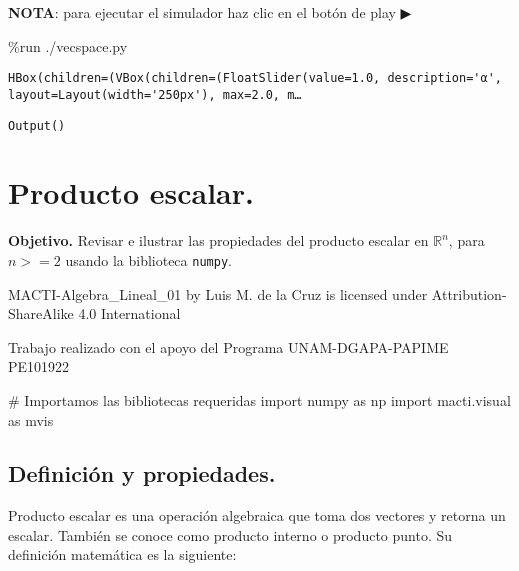 \documentclass[
  letterpaper,
  DIV=11,
  numbers=noendperiod]{scrreprt}
\newenvironment{Shaded}{\begin{snugshade}}{\end{snugshade}}
\newcommand{\CommentTok}[1]{\textcolor[rgb]{0.37,0.37,0.37}{#1}}
\newcommand{\ImportTok}[1]{\textcolor[rgb]{0.00,0.46,0.62}{#1}}
\newcommand{\NormalTok}[1]{\textcolor[rgb]{0.00,0.23,0.31}{#1}}
\newcommand{\OperatorTok}[1]{\textcolor[rgb]{0.37,0.37,0.37}{#1}}
\begin{document}
\textbf{NOTA}: para ejecutar el simulador haz clic en el botón de play ▶

\begin{Shaded}
\begin{Highlighting}[]
\OperatorTok{\%}\NormalTok{run .}\OperatorTok{/}\NormalTok{vecspace.py}
\end{Highlighting}
\end{Shaded}

\begin{verbatim}
HBox(children=(VBox(children=(FloatSlider(value=1.0, description='α', layout=Layout(width='250px'), max=2.0, m…
\end{verbatim}

\begin{verbatim}
Output()
\end{verbatim}


\chapter{Producto escalar.}\label{producto-escalar.}

\textbf{Objetivo.} Revisar e ilustrar las propiedades del producto
escalar en \(\mathbb{R}^n\), para \(n>=2\) usando la biblioteca
\texttt{numpy}.

MACTI-Algebra\_Lineal\_01 by Luis M. de la Cruz is licensed under
Attribution-ShareAlike 4.0 International

Trabajo realizado con el apoyo del Programa UNAM-DGAPA-PAPIME PE101922

\begin{Shaded}
\begin{Highlighting}[]
\CommentTok{\# Importamos las bibliotecas requeridas}
\ImportTok{import}\NormalTok{ numpy }\ImportTok{as}\NormalTok{ np}
\ImportTok{import}\NormalTok{ macti.visual }\ImportTok{as}\NormalTok{ mvis}
\end{Highlighting}
\end{Shaded}

\section{Definición y propiedades.}\label{definiciuxf3n-y-propiedades.}

Producto escalar es una operación algebraica que toma dos vectores y
retorna un escalar. También se conoce como producto interno o producto
punto. Su definición matemática es la siguiente:
\end{document}
